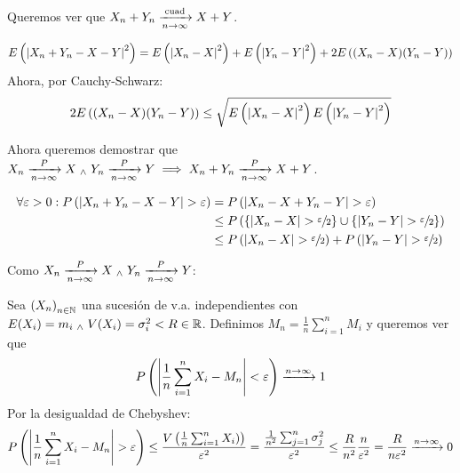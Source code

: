 Queremos ver que $X_n + Y_n \xrightarrow[n\to\infty]{\text{cuad}} X + Y$.
\begin{dem} %
	\[E\left(\left|X_n + Y_n - X - Y\right|^2\right) = E\left(\left|X_n - X\right|^2\right) + E\left(\left|Y_n - Y\right|^2\right) + 2E\left((X_n - X)(Y_n - Y)\right)\]
	Ahora, por Cauchy-Schwarz:
	\[2E\left((X_n - X)(Y_n - Y)\right) \leq \sqrt{E\left(\left|X_n - X\right|^2\right)E\left(\left|Y_n - Y\right|^2\right)}\]
\end{dem}

Ahora queremos demostrar que $X_n \xrightarrow[n\to\infty]{P} X \; _{\wedge} \; Y_n \xrightarrow[n\to\infty]{P} Y \implies X_n + Y_n \xrightarrow[n\to\infty]{P} X + Y$.
\begin{dem}%
	\[\begin{aligned}
			\forall \varepsilon > 0 : P\left(\left|X_n + Y_n - X - Y\right| > \varepsilon\right) & = P\left(\left|X_n - X + Y_n - Y\right| > \varepsilon\right)                                                            \\
			                                                                              & \leq P\left(\{\left|X_n - X\right| > \sfrac{\varepsilon}{2}\} \cup \{\left|Y_n - Y\right| > \sfrac{\varepsilon}{2}\}\right)    \\
			                                                                              & \leq P\left(\left|X_n - X\right| > \sfrac{\varepsilon}{2}\right) + P\left(\left|Y_n - Y\right| > \sfrac{\varepsilon}{2}\right)
		\end{aligned}\]

	Como $X_n \xrightarrow[n\to\infty]{P} X \; _{\wedge} \; Y_n \xrightarrow[n\to\infty]{P} Y$:
\end{dem}


 Sea $\left(X_n\right)_{n\in\mathbb{N}}$ una sucesión de v.a. independientes con $E(X_i) = m_i \; _{\wedge} \; V(X_i) = \sigma_i^2 < R \in \mathbb{R}$. Definimos $M_n = \frac{1}{n} \sum_{i=1}^{n} M_i$ y queremos ver que
\[P\left(\left|\frac{1}{n} \sum_{i=1}^{n} X_i - M_n\right| < \varepsilon\right) \xrightarrow{n\to\infty} 1\]
Por la desigualdad de Chebyshev:
\[P\left(\left|\frac{1}{n} \sum_{i=1}^{n} X_i - M_n\right| > \varepsilon\right) \leq \frac{V\left(\frac{1}{n} \sum_{i=1}^{n} X_i)\right)}{\varepsilon^2} = \frac{\frac{1}{n^2} \sum_{j=1}^n \sigma_j^2}{\varepsilon^2} \leq \frac{R}{n^2}\frac{n}{\varepsilon^2} = \frac{R}{n\varepsilon^2} \xrightarrow{n\to\infty} 0\]